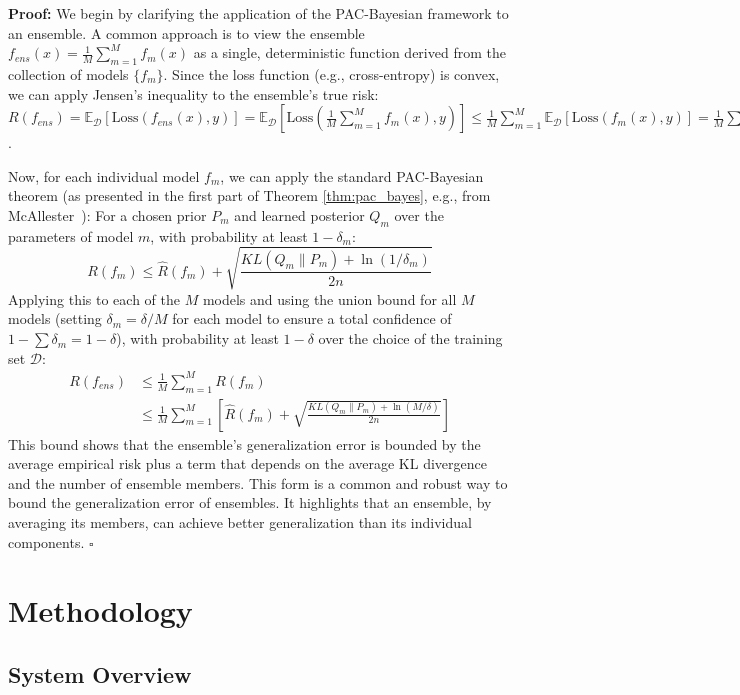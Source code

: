 \documentclass[journal]{IEEEtran}
\newcounter{theorem}
\newenvironment{proof}{\par\medskip\noindent \textbf{Proof:} \rmfamily}{\hfill$\square$\medskip}
\begin{document}
\begin{proof}
We begin by clarifying the application of the PAC-Bayesian framework to an ensemble. A common approach is to view the ensemble $f_{ens}(x) = \frac{1}{M} \sum_{m=1}^M f_m(x)$ as a single, deterministic function derived from the collection of models $\{f_m\}$. Since the loss function (e.g., cross-entropy) is convex, we can apply Jensen's inequality to the ensemble's true risk:
$R(f_{ens}) = \mathbb{E}_{\mathcal{D}}[\text{Loss}(f_{ens}(x), y)] = \mathbb{E}_{\mathcal{D}}[\text{Loss}(\frac{1}{M}\sum_{m=1}^M f_m(x), y)] \le \frac{1}{M}\sum_{m=1}^M \mathbb{E}_{\mathcal{D}}[\text{Loss}(f_m(x), y)] = \frac{1}{M}\sum_{m=1}^M R(f_m)$.

Now, for each individual model $f_m$, we can apply the standard PAC-Bayesian theorem (as presented in the first part of Theorem \ref{thm:pac_bayes}, e.g., from McAllester~\cite{mcallester1999pac_original}): For a chosen prior $P_m$ and learned posterior $Q_m$ over the parameters of model $m$, with probability at least $1-\delta_m$:
\begin{equation}
R(f_m) \leq \hat{R}(f_m) + \sqrt{\frac{KL(Q_m \| P_m) + \ln(1/\delta_m)}{2n}}
\end{equation}
Applying this to each of the $M$ models and using the union bound for all $M$ models (setting $\delta_m = \delta/M$ for each model to ensure a total confidence of $1-\sum \delta_m = 1-\delta$), with probability at least $1-\delta$ over the choice of the training set $\mathcal{D}$:
\begin{align*}
R(f_{ens}) &\leq \frac{1}{M}\sum_{m=1}^M R(f_m) \\
&\leq \frac{1}{M}\sum_{m=1}^M \left[ \hat{R}(f_m) + \sqrt{\frac{KL(Q_m \| P_m) + \ln(M/\delta)}{2n}} \right]
\end{align*}
This bound shows that the ensemble's generalization error is bounded by the average empirical risk plus a term that depends on the average KL divergence and the number of ensemble members. This form is a common and robust way to bound the generalization error of ensembles. It highlights that an ensemble, by averaging its members, can achieve better generalization than its individual components.
\end{proof}

\section{Methodology}
\label{sec:methodology}

\subsection{System Overview}
\end{document}
